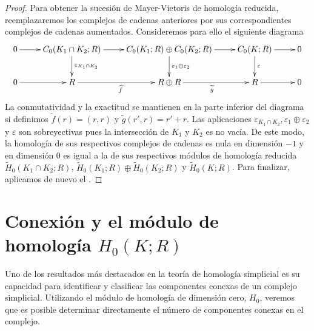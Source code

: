 \begin{proof}
	Para obtener la sucesión de Mayer-Vietoris de homología reducida, reemplazaremos
	los complejos de cadenas anteriores por sus correspondientes complejos de cadenas
	aumentados. Consideremos para ello el siguiente diagrama
	\[
	\xymatrix{ 0 \ar@{->}[r] & C_0(K_1 \cap K_2;R) \ar@{->}[d]^{\varepsilon_{K_1 \cap K_2}} \ar@{->}[r] & C_0(K_1;R) \oplus C_0(K_2;R) \ar@{->}[r] \ar@{->}[d]^{\varepsilon_1 \oplus \varepsilon_2} & C_0(K;R) \ar@{->}[d]^{\varepsilon} \ar@{->}[r] & 0 \\ 0 \ar@{->}[r] & R \ar@{->}[r]_{\widetilde{f}} & R \oplus R \ar@{->}[r]_{\widetilde{g}} & R \ar@{->}[r] & 0 }
	\]
	La conmutatividad y la exactitud se mantienen en la parte inferior del
	diagrama si definimos \(\widetilde{f}(r) = (r,r)\) y
	\(\widetilde{g}(r',r) = r'+r\). Las aplicaciones \(\varepsilon_{K_1 \cap K_2}, \varepsilon
	_{1}\oplus \varepsilon_{2}\) y \(\varepsilon\) son sobreyectivas pues la intersección
	de \(K_{1}\) y \(K_{2}\) es no vacía. De este modo, la homología de sus respectivos
	complejos de cadenas es nula en dimensión \(-1\) y en dimensión \(0\) es igual a la
	de sus respectivos módulos de homología reducida \(\widetilde{H}_{0}(K_{1}\cap K
	_{2};R)\), \(\widetilde{H}_{0}(K_{1};R) \oplus \widetilde{H}_{0}(K_{2};R)\) y
	\(\widetilde{H}_{0}(K;R)\). Para finalizar, aplicamos de nuevo el .
\end{proof}

\section{Conexión y el módulo de homología \(H_0(K;R)\)}

Uno de los resultados más destacados en la teoría de homología simplicial es su capacidad para identificar y clasificar las componentes conexas de un complejo simplicial. Utilizando el módulo de homología de dimensión cero, \( H_0 \), veremos que es posible determinar directamente el número de componentes conexas en el complejo.

